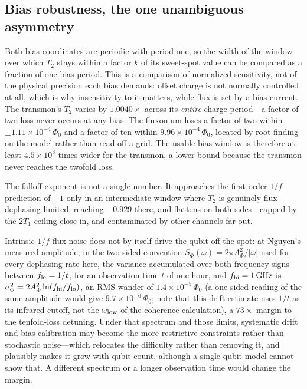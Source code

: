 \documentclass{SciPost}
\begin{document}
\subsection{Bias robustness, the one unambiguous asymmetry}

Both bias coordinates are periodic with period one, so the width of the window over which
$T_2$ stays within a factor $k$ of its sweet-spot value can be compared as a fraction of one bias
period. This is a comparison of normalized sensitivity, not of the physical precision each bias
demands: offset charge is not normally controlled at all, which is why insensitivity to it
matters, while flux is set by a bias current. The transmon's $T_2$ varies by $1.0040\times$ across its \emph{entire}
charge period---a factor-of-two loss never occurs at any bias. The fluxonium loses a factor
of two within $\pm 1.11\times10^{-4}\,\Phi_0$ and a factor of ten within $9.96\times10^{-4}\,\Phi_0$, located by root-finding on the model rather than read off a
grid. The usable bias window is therefore at least $4.5\times10^{3}$ times wider for the transmon,
a lower bound because the transmon never reaches the twofold loss.

The falloff exponent is not a single number. It approaches the first-order $1/f$ prediction
of $-1$ only in an intermediate window where $T_2$ is genuinely flux-dephasing limited,
reaching $-0.929$ there, and flattens on both sides---capped by the $2T_1$ ceiling close in,
and contaminated by other channels far out.

Intrinsic $1/f$ flux noise does not by itself drive the qubit off the spot: at Nguyen's measured amplitude, in the two-sided convention $S_\Phi(\omega)=2\pi A_\Phi^2/|\omega|$ used
for every dephasing rate here, the variance accumulated over both frequency signs between
$f_{\rm lo}=1/t$, for an observation time $t$ of one hour, and $f_{\rm hi}=\SI{1}{\giga\hertz}$ is
$\sigma_\Phi^2=2A_\Phi^2\ln(f_{\rm hi}/f_{\rm lo})$, an RMS wander of $1.4\times10^{-5}\,\Phi_0$
(a one-sided reading of the same amplitude would give $9.7\times10^{-6}\,\Phi_0$; note that this drift
estimate uses $1/t$ as its infrared cutoff, not the $\omega_{\rm low}$ of the coherence calculation), a $73\times$ margin to the tenfold-loss detuning. Under that spectrum and those
limits, systematic drift and bias calibration may become the more restrictive constraints rather
than stochastic noise---which relocates the difficulty rather than removing it, and plausibly makes it grow with qubit
count, although a single-qubit model cannot show that. A different spectrum or a longer observation time would change the margin.
\end{document}
